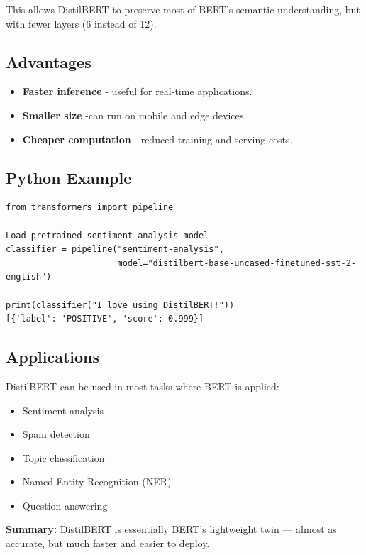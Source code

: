 \documentclass{article}
\begin{document}
This allows DistilBERT to preserve most of BERT's semantic understanding, 
but with fewer layers (6 instead of 12).  

\subsection*{Advantages}
\begin{itemize}
    \item \textbf{Faster inference} - useful for real-time applications.  
    \item \textbf{Smaller size} -can run on mobile and edge devices.  
    \item \textbf{Cheaper computation} - reduced training and serving costs.  
\end{itemize}

\subsection*{Python Example}
\begin{verbatim}
from transformers import pipeline

Load pretrained sentiment analysis model
classifier = pipeline("sentiment-analysis",
                      model="distilbert-base-uncased-finetuned-sst-2-english")

print(classifier("I love using DistilBERT!"))
[{'label': 'POSITIVE', 'score': 0.999}]
\end{verbatim}

\subsection*{Applications}
DistilBERT can be used in most tasks where BERT is applied:
\begin{itemize}
    \item Sentiment analysis  
    \item Spam detection  
    \item Topic classification  
    \item Named Entity Recognition (NER)  
    \item Question answering  
\end{itemize}

\bigskip
\noindent
\textbf{Summary:} DistilBERT is essentially BERT's lightweight twin --- 
almost as accurate, but much faster and easier to deploy.
\end{document}
